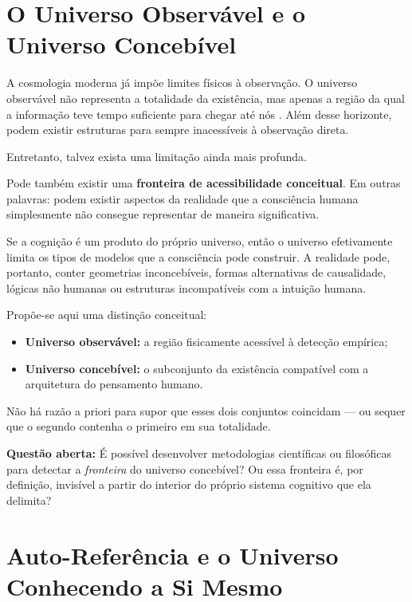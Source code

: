 \documentclass[12pt,a4paper]{article}
\begin{document}
\section{O Universo Observável e o Universo Concebível}

A cosmologia moderna já impõe limites físicos à observação. O universo
observável não representa a totalidade da existência, mas apenas a região
da qual a informação teve tempo suficiente para chegar até nós \citep{guth1997}.
Além desse horizonte, podem existir estruturas para sempre inacessíveis
à observação direta.

Entretanto, talvez exista uma limitação ainda mais profunda.

Pode também existir uma \textbf{fronteira de acessibilidade conceitual}.
Em outras palavras: podem existir aspectos da realidade que a consciência
humana simplesmente não consegue representar de maneira significativa.

Se a cognição é um produto do próprio universo, então o universo
efetivamente limita os tipos de modelos que a consciência pode construir.
A realidade pode, portanto, conter geometrias inconcebíveis, formas
alternativas de causalidade, lógicas não humanas ou estruturas
incompatíveis com a intuição humana.

Propõe-se aqui uma distinção conceitual:

\begin{itemize}
  \item \textbf{Universo observável:} a região fisicamente acessível
    à detecção empírica;
  \item \textbf{Universo concebível:} o subconjunto da existência
    compatível com a arquitetura do pensamento humano.
\end{itemize}

Não há razão a priori para supor que esses dois conjuntos coincidam —
ou sequer que o segundo contenha o primeiro em sua totalidade.

\begin{tcolorbox}[questionbox]
  \textbf{Questão aberta:} É possível desenvolver metodologias científicas
  ou filosóficas para detectar a \textit{fronteira} do universo concebível?
  Ou essa fronteira é, por definição, invisível a partir do interior
  do próprio sistema cognitivo que ela delimita?
\end{tcolorbox}

\section{Auto-Referência e o Universo Conhecendo a Si Mesmo}
\end{document}
